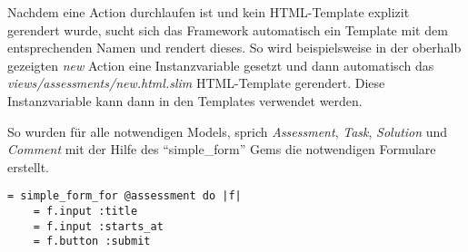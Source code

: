 Nachdem eine Action durchlaufen ist und kein HTML-Template explizit gerendert wurde, sucht sich das Framework automatisch
ein Template mit dem entsprechenden Namen und rendert dieses. So wird beispielsweise in der 
oberhalb gezeigten \emph{new} Action eine Instanzvariable gesetzt und dann automatisch das \emph{views/assessments/new.html.slim} HTML-Template gerendert.
Diese Instanzvariable kann dann in den Templates verwendet werden.

So wurden für alle notwendigen Models, sprich \emph{Assessment}, \emph{Task}, \emph{Solution} und \emph{Comment} mit der Hilfe des \enquote{simple\_form} Gems
die notwendigen Formulare erstellt.

\begin{codebox}
\begin{verbatim}
= simple_form_for @assessment do |f|
    = f.input :title
    = f.input :starts_at
    = f.button :submit
\end{verbatim}
\end{codebox}
